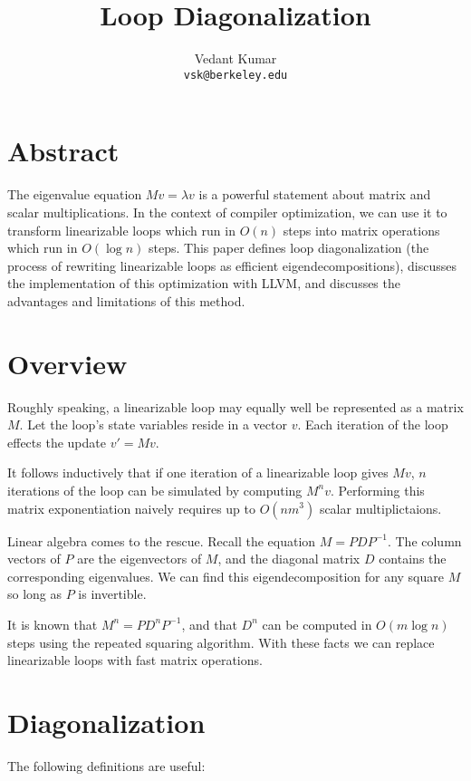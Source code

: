 \documentclass[10pt]{article}
\title{Loop Diagonalization}
\author{Vedant Kumar \\ \texttt{vsk@berkeley.edu}}
\begin{document}
\maketitle

\section{Abstract}

The eigenvalue equation $Mv = \lambda v$ is a powerful statement about
matrix and scalar multiplications. In the context of compiler optimization,
we can use it to transform linearizable loops which run in $O(n)$ steps into
matrix operations which run in $O(\log n)$ steps.  This paper defines loop
diagonalization (the process of rewriting linearizable loops as efficient
eigendecompositions), discusses the implementation of this optimization with
LLVM, and discusses the advantages and limitations of this method.

\section{Overview}

Roughly speaking, a linearizable loop may equally well be represented as a
matrix $M$. Let the loop's state variables reside in a vector $v$. Each
iteration of the loop effects the update $v' = Mv$.  

It follows inductively that if one iteration of a linearizable loop gives
$Mv$, $n$ iterations of the loop can be simulated by computing $M^n v$.
Performing this matrix exponentiation naively requires up to $O(nm^3)$
scalar multiplictaions.

Linear algebra comes to the rescue. Recall the equation $M = PDP^{-1}$.  The
column vectors of $P$ are the eigenvectors of $M$, and the diagonal matrix
$D$ contains the corresponding eigenvalues. We can find this
eigendecomposition for any square $M$ so long as $P$ is invertible.

It is known that $M^n = PD^nP^{-1}$, and that $D^n$ can be computed in
$O(m\log n)$ steps using the repeated squaring algorithm. With these facts
we can replace linearizable loops with fast matrix operations.

\section{Diagonalization}

The following definitions are useful: \\
\end{document}
